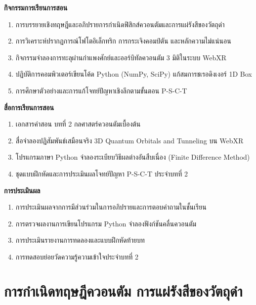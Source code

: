 \begin{lessonplanbox}
\vspace{0.4em}
\noindent\textbf{กิจกรรมการเรียนการสอน}
\begin{enumerate}
    \item การบรรยายเชิงทฤษฎีและอภิปรายการกำเนิดฟิสิกส์ควอนตัมและการแผ่รังสีของวัตถุดำ
    \item การวิเคราะห์ปรากฏการณ์โฟโตอิเล็กทริก การกระเจิงคอมป์ตัน และหลักความไม่แน่นอน
    \item กิจกรรมจำลองการทะลุผ่านกำแพงศักย์และออร์บิทัลควอนตัม 3 มิติในระบบ WebXR
    \item ปฏิบัติการคอมพิวเตอร์เขียนโค้ด Python (NumPy, SciPy) แก้สมการชเรอดิงเงอร์ 1D Box
    \item การศึกษาตัวอย่างและการแก้โจทย์ปัญหาเชิงลึกตามขั้นตอน P-S-C-T
\end{enumerate}

\vspace{0.4em}
\noindent\textbf{สื่อการเรียนการสอน}
\begin{enumerate}
    \item เอกสารคำสอน บทที่ 2 กลศาสตร์ควอนตัมเบื้องต้น
    \item สื่อจำลองปฏิสัมพันธ์เสมือนจริง 3D Quantum Orbitals and Tunneling บน WebXR
    \item โปรแกรมภาษา Python จำลองระเบียบวิธีผลต่างอันสืบเนื่อง (Finite Difference Method)
    \item ชุดแบบฝึกหัดและการประเมินผลโจทย์ปัญหา P-S-C-T ประจำบทที่ 2
\end{enumerate}

\vspace{0.4em}
\noindent\textbf{การประเมินผล}
\begin{enumerate}
    \item การประเมินผลจากการมีส่วนร่วมในการอภิปรายและการตอบคำถามในชั้นเรียน
    \item การตรวจผลงานการเขียนโปรแกรม Python จำลองฟังก์ชันคลื่นควอนตัม
    \item การประเมินรายงานการทดลองและแบบฝึกหัดท้ายบท
    \item การทดสอบย่อยวัดความรู้ความเข้าใจประจำบทที่ 2
\end{enumerate}
\end{lessonplanbox}

\newpage

\section{การกำเนิดทฤษฎีควอนตัม การแผ่รังสีของวัตถุดำ}

